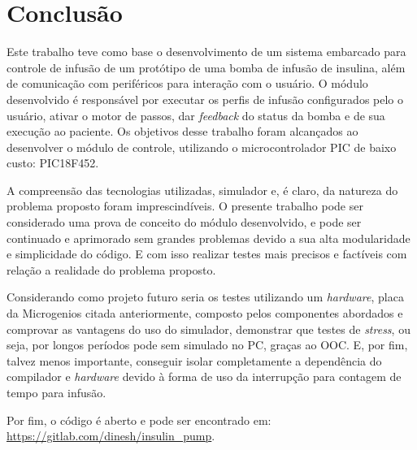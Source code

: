 \chapter{Conclusão}

Este trabalho teve como base o desenvolvimento de um sistema embarcado para controle de infusão de um protótipo de uma bomba de infusão de insulina, além de comunicação com periféricos para interação com o usuário. O módulo desenvolvido é responsável por executar os perfis de infusão configurados pelo o usuário, ativar o motor de passos, dar \emph{feedback} do status da bomba e de sua execução ao paciente. Os objetivos desse trabalho foram alcançados ao desenvolver o módulo de controle, utilizando o microcontrolador PIC de baixo custo: PIC18F452. 

A compreensão das tecnologias utilizadas, simulador e, é claro, da natureza do problema proposto foram imprescindíveis. O presente trabalho pode ser considerado uma prova de conceito do módulo desenvolvido, e pode ser continuado e aprimorado sem grandes problemas devido a sua alta modularidade e simplicidade do código. E com isso realizar testes mais precisos e factíveis com relação a realidade do problema proposto. 

Considerando como projeto futuro seria os testes utilizando um \emph{hardware}, placa da Microgenios citada anteriormente, composto pelos componentes abordados e comprovar as vantagens do uso do simulador, demonstrar que testes de \emph{stress}, ou seja, por longos períodos pode sem simulado no PC, graças ao OOC. E, por fim, talvez menos importante, conseguir isolar completamente a dependência do compilador e \emph{hardware} devido à forma de uso da interrupção para contagem de tempo para infusão.

Por fim, o código é aberto e pode ser encontrado em: \url{https://gitlab.com/dinesh/insulin_pump}.